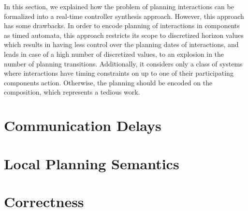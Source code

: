 In this section, we explained how the problem of planning interactions can be formalized into
a real-time controller synthesis approach. However, this approach has some drawbacks.
In order to encode planning of interactions in components as timed automata, this approach
restricts its scope to discretized horizon values which results in having less control
over the planning dates of interactions, and leads in case of a high number of discretized values,
to an explosion in the number of planning transitions. 
Additionally, it considers only a class of systems where interactions have timing constraints on 
up to one of their participating components action. Otherwise, the planning should be encoded
on the composition, which represents a tedious work. 

\section{Communication Delays}
\section{Local Planning Semantics}
\section{Correctness}







